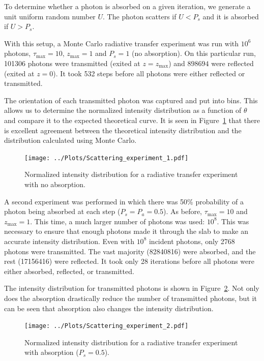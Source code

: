 \documentclass[twocolumn]{myarticle}
\begin{document}
To determine whether a photon is absorbed on a given iteration, we generate a unit uniform random number $ U $. 
The photon scatters if $ U < P_s $ and it is absorbed if $ U > P_s $.

With this setup, a Monte Carlo radiative transfer experiment was run with $ 10^6 $ photons, $ \tau_\text{max} = 10 $, $ z_\text{max} = 1 $ and $ P_s = 1 $ (no absorption).
On this particular run, 101306 photons were transmitted (exited at $ z = z_\text{max} $) and $ 898694 $ were reflected (exited at $ z = 0 $).
It took 532 steps before all photons were either reflected or transmitted.

The orientation of each transmitted photon was captured and put into bins.
This allows us to determine the normalized intensity distribution as a function of $ \theta $ and compare it to the expected theoretical curve.
It is seen in Figure~\ref{fig:scattering_experiment_1} that there is excellent agreement between the theoretical intensity distribution and the distribution calculated using Monte Carlo.

\begin{figure}[ht!]
    \begin{center}
    \texttt{[image: ../Plots/Scattering\_experiment\_1.pdf]}
    \caption{%
        Normalized intensity distribution for a radiative transfer experiment with no absorption.
    }
    \label{fig:scattering_experiment_1}
    \end{center}
\end{figure}

A second experiment was performed in which there was 50\% probability of a photon being absorbed at each step ($ P_s = P_a = 0.5 $).
As before, $ \tau_\text{max} = 10 $ and $ z_\text{max} = 1 $.
This time, a much larger number of photons was used: $ 10^8 $.
This was necessary to ensure that enough photons made it through the slab to make an accurate intensity distribution.
Even with $ 10^8 $ incident photons, only 2768 photons were transmitted.
The vast majority (82840816) were absorbed, and the rest (17156416) were reflected.
It took only 28 iterations before all photons were either absorbed, reflected, or transmitted.

The intensity distribution for transmitted photons is shown in Figure~\ref{fig:scattering_experiment_2}.
Not only does the absorption drastically reduce the number of transmitted photons, but it can be seen that absorption also changes the intensity distribution.

\begin{figure}[ht!]
    \begin{center}
    \texttt{[image: ../Plots/Scattering\_experiment\_2.pdf]}
    \caption{%
        Normalized intensity distribution for a radiative transfer experiment with absorption ($ P_s = 0.5 $).
    }
    \label{fig:scattering_experiment_2}
    \end{center}
\end{figure}
\end{document}
